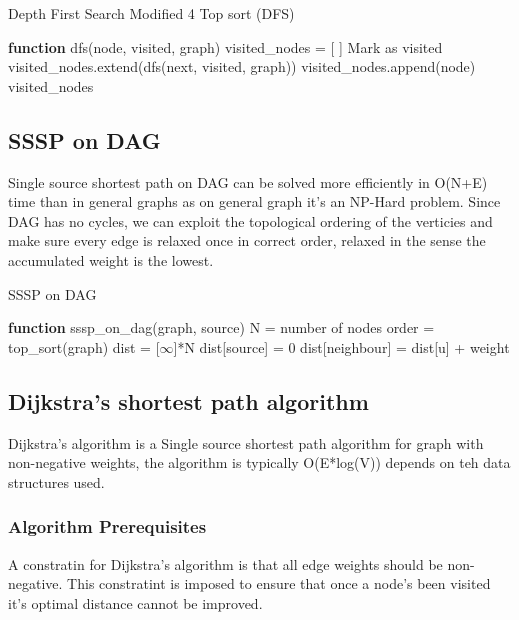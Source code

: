 \documentclass[12pt]{extarticle}
\begin{document}
\begin{algorithm} [H]
    \caption{Depth First Search Modified 4 Top sort (DFS)}
    \begin{algorithmic}[1]
        \STATE \textbf{function} dfs(node, visited, graph)
        \STATE visited\_nodes = [ ]
        \RETURN
        \ENDIF
        \STATE Mark as visited
        \STATE visited\_nodes.extend(dfs(next, visited, graph))
        \ENDFOR
        \STATE visited\_nodes.append(node)
        \RETURN visited\_nodes
    \end{algorithmic}
\end{algorithm}

\subsection{SSSP on DAG}
Single source shortest path on DAG can be solved more efficiently in O(N+E) time 
than in general graphs as on general graph it's an NP-Hard problem. Since DAG
has no cycles, we can exploit the topological ordering of the verticies and make
sure every edge is relaxed once in correct order, relaxed in the sense the accumulated
weight is the lowest. 

\begin{algorithm}[H]
\caption{SSSP on DAG}
\begin{algorithmic}
    \STATE \textbf{function} sssp\_on\_dag(graph, source)
    \STATE N = number of nodes
    \STATE order = top\_sort(graph)
    \STATE dist = [$\infty$]*N
    \STATE dist[source] = 0
    \STATE dist[neighbour] = dist[u] + weight
    \ENDIF
    \ENDFOR
    \ENDFOR
\end{algorithmic}
\end{algorithm}

\subsection{Dijkstra's shortest path algorithm}
Dijkstra's algorithm is a Single source shortest path algorithm for graph with 
non-negative weights, the algorithm is typically O(E*log(V)) depends on teh data
structures used. 
\subsubsection*{Algorithm Prerequisites}
A constratin for Dijkstra's algorithm is that all edge weights should be non-negative. 
This constratint is imposed to ensure that once a node's been visited it's optimal 
distance cannot be improved. 
\end{document}
